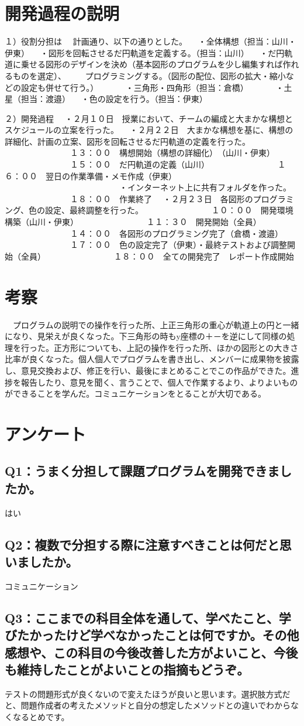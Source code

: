 \documentclass[12pt,a4j]{jarticle}
\begin{document}
\section{開発過程の説明}

１）役割分担は
　計画通り、以下の通りとした。
　・全体構想（担当：山川・伊東）
　・図形を回転させるだ円軌道を定義する。（担当：山川）
　・だ円軌道に乗せる図形のデザインを決め（基本図形のプログラムを少し編集すれば作れるものを選定）、
　　プログラミングする。（図形の配位、図形の拡大・縮小などの設定も併せて行う。）
　　　・三角形・四角形（担当：倉橋）
　　　・土星（担当：渡邉）
　・色の設定を行う。（担当：伊東）

２）開発過程
　・２月１０日　授業において、チームの編成と大まかな構想とスケジュールの立案を行った。
　・２月２２日　大まかな構想を基に、構想の詳細化、計画の立案、図形を回転させるだ円軌道の定義を行った。
　　　　　　　　１３：００　構想開始（構想の詳細化）　（山川・伊東）
　　　　　　　　１５：００　だ円軌道の定義（山川）
　　　　　　　　１６：００　翌日の作業準備・メモ作成（伊東）
　　　　　　　　　　　　　　・インターネット上に共有フォルダを作った。
　　　　　　　　１８：００　作業終了
　・２月２３日　各図形のプログラミング、色の設定、最終調整を行った。
　　　　　　　　１０：００　開発環境構築（山川・伊東）
　　　　　　　　１１：３０　開発開始（全員）
　　　　　　　　１４：００　各図形のプログラミング完了（倉橋・渡邉）
　　　　　　　　１７：００　色の設定完了（伊東）・最終テストおよび調整開始（全員）
　　　　　　　　１８：００　全ての開発完了　レポート作成開始
               
\section{考察}
　プログラムの説明での操作を行った所、上正三角形の重心が軌道上の円と一緒になり、見栄えが良くなった。下三角形の時もy座標の＋－を逆にして同様の処理を行った。正方形についても、上記の操作を行った所、ほかの図形との大きさ比率が良くなった。個人個人でプログラムを書き出し、メンバーに成果物を披露し、意見交換および、修正を行い、最後にまとめることでこの作品ができた。進捗を報告したり、意見を聞く、言うことで、個人で作業するより、よりよいものができることを学んだ。コミュニケーションをとることが大切である。

\section{アンケート}

\subsection{Q1：うまく分担して課題プログラムを開発できましたか。}
はい

\subsection{Q2：複数で分担する際に注意すべきことは何だと思いましたか。}
コミュニケーション

\subsection{Q3：ここまでの科目全体を通して、学べたこと、学びたかったけど学べなかったことは何ですか。その他感想や、この科目の今後改善した方がよいこと、今後も維持したことがよいことの指摘もどうぞ。}
テストの問題形式が良くないので変えたほうが良いと思います。選択肢方式だと、問題作成者の考えたメソッドと自分の想定したメソッドとの違いでわからなくなるとめです。
\end{document}
